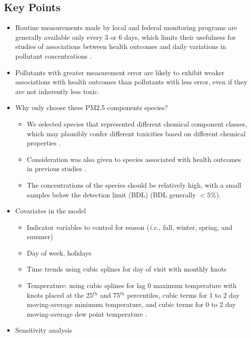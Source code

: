 \documentclass{article}
\begin{document}
\subsection{Key Points}
\begin{itemize}
    \item Routine measurements made by local and federal monitoring programs are generally available only every 3 or 6 days, which limits their usefulness for studies of associations between health outcomes and daily variations in pollutant concentrations \citep{sarnat2015fine}.
    \item Pollutants with greater measurement error are likely to exhibit weaker associations with health outcomes than pollutants with less error, even if they are not inherently less toxic.
    \item Why only choose these PM2.5 components species? {
        \begin{itemize}
            \item We selected species that represented different chemical component classes, which may plausibly confer different toxicities based on different chemical properties \citep{suh2011chemical}. 
            \item Consideration was also given to species associated with health outcomes in previous studies \citep{chen2009effects, kelly2012size, rohr2012attributing}.
            \item The concentrations of the species should be relatively high, with a small samples below the detection limit (BDL) (BDL generally $<5\%$).
        \end{itemize}
    }
    \item Covariates in the model {
        \begin{itemize}
            \item Indicator variables to control for season (\textit{i.e.,} fall, winter, spring, and summer)
            \item Day of week, holidays
            \item Time trends using cubic splines for day of visit with monthly knots
            \item Temperature: using cubic splines for lag 0 maximum temperature with knots placed at the 25$^{th}$ and 75$^{th}$ percentiles, cubic terms for 1 to 2 day moving-average minimum temperature, and cubic terms for 0 to 2 day moving-average dew point temperature \citep{strickland2010short}.
        \end{itemize}
    }
    \item Sensitivity analysis {
}
\end{itemize}
\end{document}
